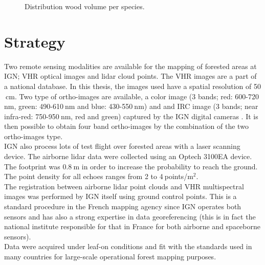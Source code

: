 \begin{figure}[htbp]
\begin{center}
\caption{Distribution wood volume per species.}
\end{center}
\end{figure}

\section{Strategy}
Two remote sensing modalities are available for the mapping of forested areas at IGN; VHR optical images and lidar cloud points. The VHR images are a part of a national database. In this thesis, the images used have a spatial resolution of 50$\:$cm. Two type of ortho-images are available, a color image (3 bands; red: 600-720$\:$nm, green: 490-610$\:$nm and blue: 430-550$\:$nm) and and IRC image (3 bands; near infra-red: 750-950$\:$nm, red and green) captured by the IGN digital cameras \citep{souchon2012large}. It is then possible to obtain four band ortho-images by the combination of the two ortho-images type. \\
IGN also process lots of test flight over forested areas with a laser scanning device. The airborne lidar data were collected using an Optech 3100EA device. The footprint was 0.8$\:$m in order to increase the probability to reach the ground. The point density {for all echoes} ranges from 2 to 4$\:$points/m$^{2}$. \\

The registration between airborne lidar point clouds and VHR multispectral images was performed by IGN itself using ground control points. This is a standard procedure in the French mapping agency since IGN operates both sensors and has also a strong expertise in data georeferencing (this is in fact the national institute responsible for that in France for both airborne and spaceborne sensors). \\
Data were acquired under leaf-on conditions and fit with the standards used in many countries for large-scale operational forest mapping purposes. \\

